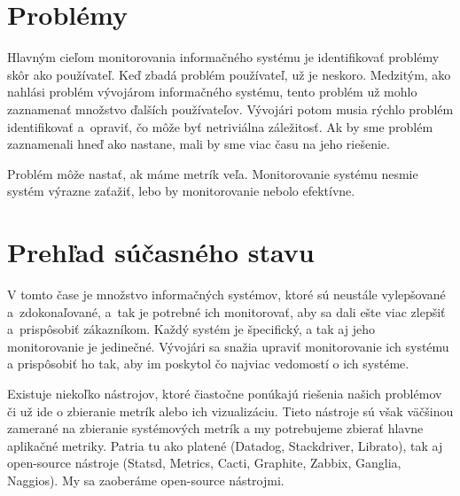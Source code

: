 \documentclass[a4paper, upjsfrontpage, disablespecwarning, thesismargins, thesislinespacing]{rnthesis}
\begin{document}

\section{Problémy}

Hlavným cieľom monitorovania informačného systému je identifikovať problémy skôr ako používateľ.
Keď zbadá problém používateľ, už je neskoro.
Medzitým, ako nahlási problém vývojárom informačného systému, tento problém už mohlo zaznamenať množstvo ďalších používateľov.
Vývojári potom musia rýchlo problém identifikovať a~opraviť, čo môže byť netriviálna záležitosť.
Ak by sme problém zaznamenali hneď ako nastane, mali by sme viac času na jeho riešenie.

Problém môže nastať, ak máme metrík veľa.
Monitorovanie systému nesmie systém výrazne zaťažiť, lebo by monitorovanie nebolo efektívne.


 \section{Prehľad súčasného stavu}

V tomto čase je množstvo informačných systémov, ktoré sú neustále vylepšované a~zdokonaľované, a~tak je potrebné ich monitorovať, aby sa dali ešte viac zlepšiť a~prispôsobiť zákazníkom.
Každý systém je špecifický, a tak aj jeho monitorovanie je jedinečné.
Vývojári sa snažia upraviť monitorovanie ich systému a prispôsobiť ho tak, aby im poskytol čo najviac vedomostí o ich systéme.

Existuje niekoľko nástrojov, ktoré čiastočne ponúkajú riešenia našich problémov či už ide o zbieranie metrík alebo ich vizualizáciu.
Tieto nástroje sú však väčšinou zamerané na zbieranie systémových metrík a my potrebujeme zbierať hlavne aplikačné metriky.
Patria tu ako platené (Datadog, Stackdriver, Librato), tak aj open-source nástroje (Statsd, Metrics, Cacti, Graphite, Zabbix, Ganglia, Naggios).
My sa zaoberáme open-source nástrojmi.
\end{document}
